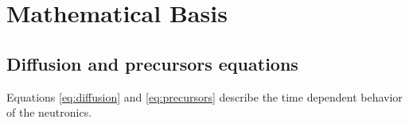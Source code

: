 \documentclass[11pt,letterpaper]{article}
\begin{document}



\section{Mathematical Basis}

\subsection{Diffusion and precursors equations}

Equations \ref{eq:diffusion} and \ref{eq:precursors} describe the time dependent behavior of the neutronics.
\end{document}
